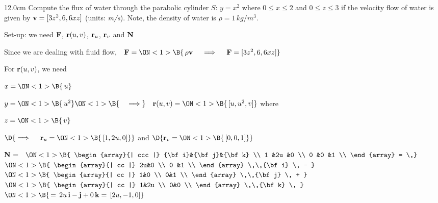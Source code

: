 \begin{frame}
\begin{columns}\begin{column}{12.0cm}
\scriptsize
\EX Compute the flux of water through the parabolic cylinder $S:\, y=x^2$ where $0 \le x \le 2$ and $0 \le z \le 3$ if the velocity flow of water is given by ${\bf v} = [3z^2, 6, 6xz]$ (units: {\em m/s}).  Note, the density of water is $\rho = 1 \, kg/m^3$.

\vspace{0.3cm}

Set-up: we need ${\bf F}$, ${\bf r}(u,v)$, ${\bf r}_u$, ${\bf r}_v$ and ${\bf N}$

\vspace{0.4cm}

Since we are dealing with fluid flow, \,\, ${\bf F} = 
\ON<1>{\B{\, \rho{\bf v} \quad \implies \quad {\bf F} = [3z^2, 6, 6xz]}}$

\vspace{0.3cm}

For ${\bf r}(u,v)$, we need

\vspace{0.2cm}

\quad $
x =
\ON<1>{\B{\,u}}$

\quad $
y =
\ON<1>{\B{\,u^2}}
\ON<1>{\B{\quad \implies}} \quad {\bf r}(u,v) =
\ON<1>{\B{\, [u,u^2,v]}}$ \qquad where 

\quad $
z =
\ON<1>{\B{\,v}}$

\vspace{0.2cm}
\hspace{1.3cm} $\D{
\implies \quad {\bf r}_u =
\ON<1>{\B{\, [1,2u,0]}}}$ \qquad 
and
\qquad $\D{
{\bf r}_v = 
\ON<1>{\B{\,[0,0,1]}}}$

\vspace{0.3cm}

{\bf N} = \,
$\ON<1>{\B{
\begin{array}{| ccc |}
	{\bf i}&{\bf j}&{\bf k} \\
	1      &2u     &0 \\
 	0      &0      &1 \\
\end{array}
= \,}}$
$\ON<1>{\B{
\begin{array}{| cc |}
		  2u&0 \\
 		  0 &1 \\
\end{array}
 \,\,{\bf i} \, - }}$\,\,
$\ON<1>{\B{
\begin{array}{| cc |}
		  1&0 \\
 		  0&1 \\
\end{array}
 \,\,{\bf j} \, + }}$\,\,
$\ON<1>{\B{
\begin{array}{| cc |}
		  1&2u \\
 		  0&0 \\
\end{array}
\,\,{\bf k} \, }}$
$
\ON<1>{\B{\, = \, 2u \,{\bf i} - {\bf j} + 0\,{\bf k} = \, [2u,-1,0]}}$


\end{column}
\end{columns}
\end{frame}
